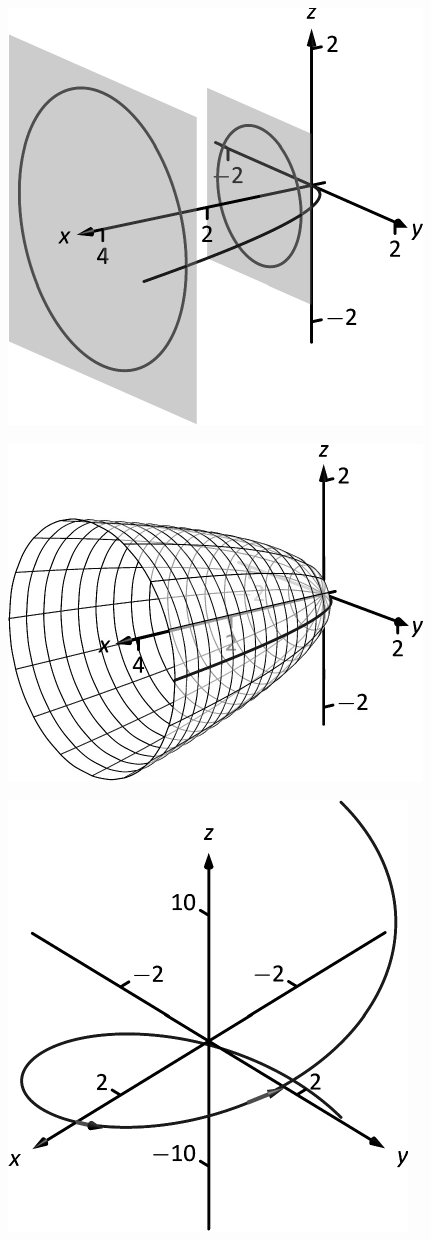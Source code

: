 \documentclass[10pt]{article}
\begin{document}
\includegraphics{figsurf_rev_intro_3DBW.pdf}
\texttt{}

\includegraphics{figsurf_rev_introb_3DBW.pdf}
\texttt{}

\includegraphics{figtannorm1_3DBW.pdf}
\texttt{}
\end{document}
